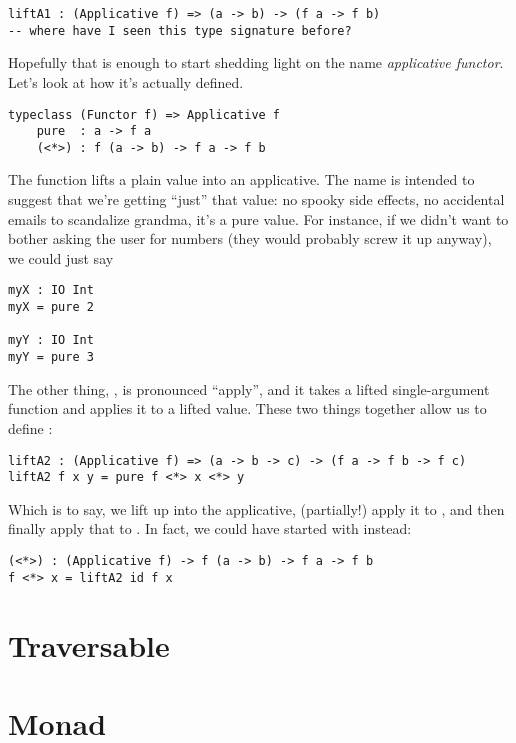 \begin{lstlisting}[language=pseudoml]
liftA1 : (Applicative f) => (a -> b) -> (f a -> f b)
-- where have I seen this type signature before?
\end{lstlisting}

Hopefully that is enough to start shedding light on the name \emph{applicative functor}. Let's look at how it's actually defined.

\begin{lstlisting}[language=pseudoml]
typeclass (Functor f) => Applicative f
    pure  : a -> f a
    (<*>) : f (a -> b) -> f a -> f b
\end{lstlisting}

The  function lifts a plain value into an applicative. The name is intended to suggest that we're getting ``just'' that value: no spooky side effects, no accidental emails to scandalize grandma, it's a pure value. For instance, if we didn't want to bother asking the user for numbers (they would probably screw it up anyway), we could just say

\begin{lstlisting}[language=pseudoml]
myX : IO Int
myX = pure 2

myY : IO Int
myY = pure 3
\end{lstlisting}

The other thing, \mlil{(<*>)}, is pronounced ``apply'', and it takes a lifted single-argument function and applies it to a lifted value. These two things together allow us to define :

\begin{lstlisting}[language=pseudoml]
liftA2 : (Applicative f) => (a -> b -> c) -> (f a -> f b -> f c)
liftA2 f x y = pure f <*> x <*> y
\end{lstlisting}

Which is to say, we lift  up into the applicative, (partially!) apply it to , and then finally apply that to . In fact, we could have started with  instead:

\begin{lstlisting}[language=pseudoml]
(<*>) : (Applicative f) -> f (a -> b) -> f a -> f b
f <*> x = liftA2 id f x
\end{lstlisting}

\section{Traversable}

\blindtext%

\section{Monad}

\blindtext%
